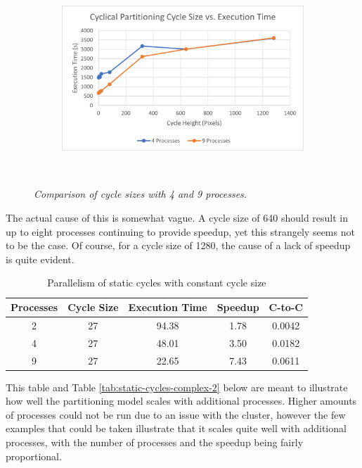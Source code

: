 \documentclass[CMPE]{KGCOEReport}
\begin{document}
\begin{figure}[H]
  \centering
  \begin{subfigure}[b]{0.85\linewidth} %
    \includegraphics[width=\linewidth]{GraphCyclical.png}
  \end{subfigure}\\
  \caption{ \textit{Comparison of cycle sizes with 4 and 9 processes.}}
  \label{fig:graph_cyclical}
\end{figure}

The actual cause of this is somewhat vague. A cycle size of 640 should 
result in up to eight processes continuing to provide speedup, yet 
this strangely seems not to be the case. Of course, for a cycle size 
of 1280, the cause of a lack of speedup is quite evident. \\

\begin{table}[h]
\centering
\caption{Parallelism of static cycles with constant cycle size}
\label{tab:static-cycles-simple-2}
\begin{tabular}{ccccc}
\hline
\multicolumn{1}{l}{Processes} & \multicolumn{1}{l}{Cycle Size} & \multicolumn{1}{l}{Execution Time} & Speedup & C-to-C \\ \hline
2 & 27 & 94.38 & 1.78 & 0.0042 \\
4 & 27 & 48.01 & 3.50 & 0.0182 \\
9 & 27 & 22.65 & 7.43 & 0.0611
\end{tabular}
\end{table}

This table and Table \ref{tab:static-cycles-complex-2} below are meant to 
illustrate how well the partitioning model scales with additional processes. 
Higher amounts of processes could not be run due to an issue with the cluster, 
however the few examples that could be taken illustrate that it scales 
quite well with additional processes, with the number of processes and the 
speedup being fairly proportional. \\
\end{document}
